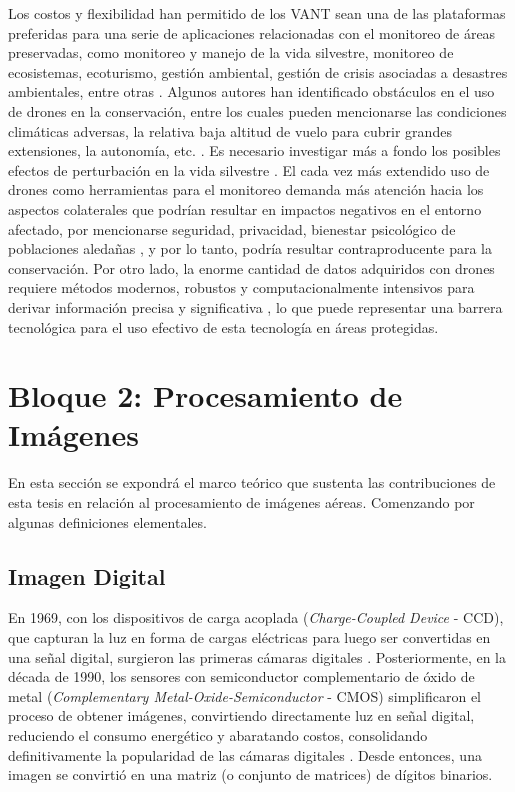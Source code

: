 Los costos y flexibilidad han permitido de los VANT sean una de las plataformas preferidas para una serie de aplicaciones relacionadas con el monitoreo de áreas preservadas, como monitoreo y manejo de la vida silvestre, monitoreo de ecosistemas, ecoturismo, gestión ambiental,  gestión de crisis asociadas a desastres ambientales, entre otras \cite{jimenez_lopez_drones_2019, bhatt_image_2022}.
Algunos autores han identificado obstáculos en el uso de drones en la conservación, entre los cuales pueden mencionarse las condiciones climáticas adversas, la relativa baja altitud de vuelo para cubrir grandes extensiones, la autonomía, etc. \cite{jimenez_lopez_drones_2019}. Es necesario investigar más a fondo los posibles efectos de perturbación en la vida silvestre \cite{millner_between_2024,mulero-pazmany_unmanned_2017,weissensteiner_low-budget_2015,bevan_measuring_2018}. El cada vez más extendido uso de drones como herramientas para el monitoreo demanda más atención hacia los aspectos colaterales que podrían resultar en impactos negativos en el entorno afectado, por mencionarse seguridad, privacidad, bienestar psicológico de poblaciones aledañas \cite{sandbrook_social_2015}, y por lo tanto, podría resultar contraproducente para la conservación. Por otro lado, la enorme cantidad de datos adquiridos con drones requiere métodos modernos, robustos y computacionalmente intensivos para derivar información precisa y significativa \cite{manfreda_use_2018}, lo que puede representar una barrera tecnológica para el uso efectivo de esta tecnología en áreas protegidas.

\section{Bloque 2: Procesamiento de Imágenes}

En esta sección se expondrá el marco teórico que sustenta las contribuciones de esta tesis en relación al procesamiento de imágenes aéreas. Comenzando por algunas definiciones elementales.

\subsection{Imagen Digital}
En 1969, con los dispositivos de carga acoplada (\textit{Charge-Coupled Device} - CCD), que capturan la luz en forma de cargas eléctricas para luego ser convertidas en una señal digital, surgieron las primeras cámaras digitales \cite{dyck_chapter_1982}. Posteriormente, en la década de 1990, los sensores con semiconductor complementario de óxido de metal (\textit{Complementary Metal-Oxide-Semiconductor} - CMOS) simplificaron el proceso de obtener imágenes, convirtiendo directamente luz en señal digital, reduciendo el consumo energético y abaratando costos, consolidando definitivamente la popularidad de las cámaras digitales \cite{fossum_cmos_1997}. Desde entonces, una imagen se convirtió en una matriz (o conjunto de matrices) de dígitos binarios.

